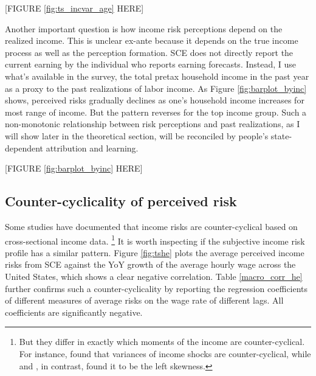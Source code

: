 \documentclass[12pt,notitlepage,onecolumn,aps,pra]{article}
\begin{document}
\begin{center}
 [FIGURE \ref{fig:ts_incvar_age} HERE]
 \end{center}

Another important question is how income risk perceptions depend on the
realized income. This is unclear ex-ante because it depends on the true
income process as well as the perception formation. SCE does not
directly report the current earning by the individual who reports
earning forecasts. Instead, I use what's available in the survey, the
total pretax household income in the past year as a proxy to the past
realizations of labor income. As Figure \ref{fig:barplot_byinc} shows,
perceived risks gradually declines as one's household income increases
for most range of income. But the pattern reverses for the top income
group. Such a non-monotonic relationship between risk perceptions and
past realizations, as I will show later in the theoretical section, will
be reconciled by people's state-dependent attribution and learning.

\begin{center}
 [FIGURE \ref{fig:barplot_byinc} HERE]
\end{center}




    \hypertarget{counter-cyclicality-of-perceived-risk}{%
\subsection{Counter-cyclicality of perceived
risk}\label{counter-cyclicality-of-perceived-risk}}

Some studies have documented that income risks are counter-cyclical
based on cross-sectional income data.
\footnote{But they differ in exactly which moments of the income are counter-cyclical. For instance, \cite{storesletten2004cyclical} found that variances of income shocks are counter-cyclical, while \cite{guvenen2014nature} and \cite{catherine_countercyclical_2019}, in contrast, found it to be the left skewness.}
It is worth inspecting if the subjective income risk profile has a
similar pattern. Figure \ref{fig:tshe} plots the average perceived
income risks from SCE against the YoY growth of the average hourly wage
across the United States, which shows a clear negative correlation.
Table \ref{macro_corr_he} further confirms such a counter-cyclicality by
reporting the regression coefficients of different measures of average
risks on the wage rate of different lags. All coefficients are
significantly negative.
\end{document}
